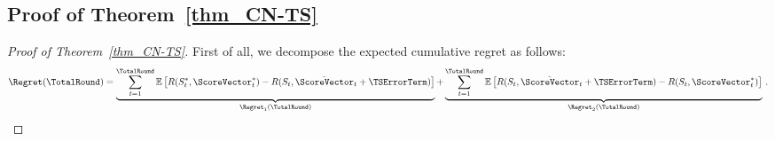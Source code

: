 \documentclass{article}
\theoremstyle{plain}
\begin{document}
\subsection{Proof of Theorem~\ref{thm_CN-TS}} \label{subsec:proof of CN-TS}
\begin{proof}[Proof of Theorem~\ref{thm_CN-TS}] %
First of all, we decompose the expected cumulative regret as follows:
    \begin{equation*}
        \Regret(\TotalRound) = \underbrace{ \sum_{t=1}^{\TotalRound} \mathbb{E} \left[ R(S_t^*, \ScoreVector_t^*) - R(S_t, \tilde{\ScoreVector}_t + \boldsymbol{\TSErrorTerm}) \right]}_{\Regret_1(\TotalRound)}
        + \underbrace{ \sum_{t=1}^{\TotalRound} \mathbb{E} \left[ R(S_t, \tilde{\ScoreVector}_t + \boldsymbol{\TSErrorTerm}) - R(S_t, \ScoreVector_t^*) \right]}_{\Regret_2(\TotalRound)} \, .
    \end{equation*}
    

\end{proof}
\end{document}
